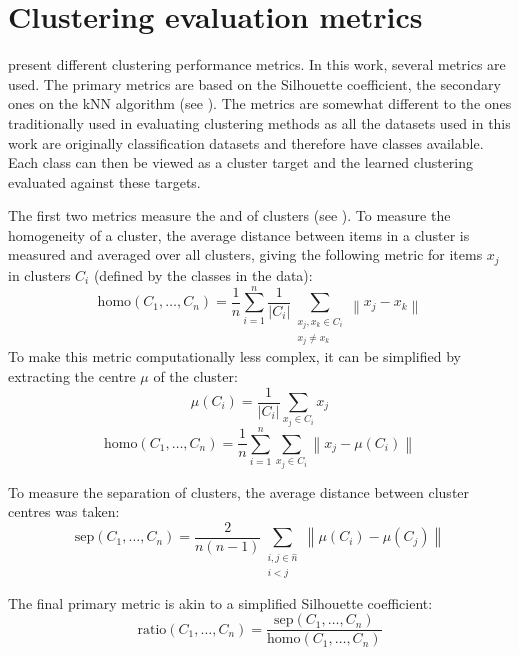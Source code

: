 \section{Clustering evaluation metrics}\label{sec:clustering-metrics}

\cite{xu_comprehensive_2015} present different clustering performance metrics. In this work, several metrics are used. The primary metrics are based on the Silhouette coefficient, the secondary ones on the kNN algorithm (see \cite{dasarathy_nearest_1991}). The metrics are somewhat different to the ones traditionally used in evaluating clustering methods as all the datasets used in this work are originally classification datasets and therefore have classes available. Each class can then be viewed as a cluster target and the learned clustering evaluated against these targets.

The first two metrics measure the  and  of clusters (see \cite{everitt_cluster_2001}). To measure the homogeneity of a cluster, the average distance between items in a cluster is measured and averaged over all clusters, giving the following metric for items \( x_j \) in clusters \( C_i \) (defined by the classes in the data):
\[ \mathrm{homo} \left( C_1, \dots, C_n \right) = \frac{1}{n} \sum_{i = 1}^n \frac{1}{\left\lvert C_i \right\rvert} \sum_{\substack{x_j, x_k \in C_i \\ x_j \neq x_k}} \left\lVert x_j - x_k \right\rVert \]
To make this metric computationally less complex, it can be simplified by extracting the centre \( \mu \) of the cluster:
\[ \mu \left( C_i \right) = \frac{1}{\left\lvert C_i \right\rvert} \sum_{x_j \in C_i} x_j \]
\[ \mathrm{homo} \left( C_1, \dots, C_n \right) = \frac{1}{n} \sum_{i = 1}^n \sum_{x_j \in C_i} \left\lVert x_j - \mu \left( C_i \right) \right\rVert \]

To measure the separation of clusters, the average distance between cluster centres was taken:
\[ \mathrm{sep} \left( C_1, \dots, C_n \right) = \frac{2}{n \left( n - 1 \right)} \sum_{\substack{i, j \in \hat{n} \\ i < j }} \left\lVert \mu \left( C_i \right) - \mu \left( C_j \right) \right\rVert \]

The final primary metric is akin to a simplified Silhouette coefficient:
\[ \mathrm{ratio} \left( C_1, \dots, C_n \right) = \frac{\mathrm{sep} \left( C_1, \dots, C_n \right)}{\mathrm{homo} \left( C_1, \dots, C_n \right)} \]

